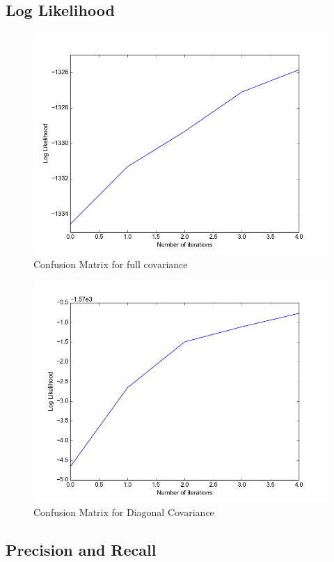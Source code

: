 \documentclass[11pt,a4paper]{article}
\begin{document}
\subsection{Log Likelihood}
\begin{minipage}[b]{0.5\textwidth}
\begin{figure}[H]
  \centering
  \includegraphics[width=.8\linewidth]{Figures/likelihood_spiral0.png}
  \caption{Confusion Matrix for full covariance}
  \label{fig:sfig1}
\end{figure}%
\end{minipage}
\begin{minipage}[b]{0.5\textwidth}
\begin{figure}[H]
  \centering
  \includegraphics[width=.8\linewidth]{Figures/likelihood_spiral1.png}
\caption{Confusion Matrix for Diagonal Covariance}
  \label{fig:sfig1}
\end{figure}%
\end{minipage}

\subsection{Precision and Recall}
\end{document}
